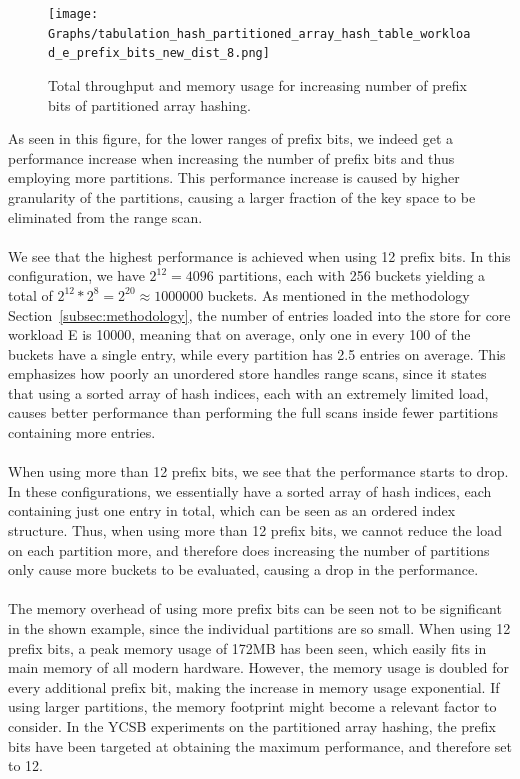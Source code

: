 \documentclass[11pt]{report} %
\begin{document}
\begin{figure}[H]
  \centering
  \texttt{[image: Graphs/tabulation\_hash\_partitioned\_array\_hash\_table\_workload\_e\_prefix\_bits\_new\_dist\_8.png]}\\
  \caption{Total throughput and memory usage for increasing number of prefix bits of partitioned array hashing.}\label{fig:prefix_bits}
\end{figure}
\noindent
As seen in this figure, for the lower ranges of prefix bits, we indeed get a performance increase when increasing the number of prefix bits and thus employing more partitions. This performance increase is caused by higher granularity of the partitions, causing a larger fraction of the key space to be eliminated from the range scan. \\
\\
We see that the highest performance is achieved when using 12 prefix bits. In this configuration, we have $2^{12} = 4096$ partitions, each with 256 buckets yielding a total of $2^{12}*2^8 = 2^{20} \approx 1000000$ buckets. As mentioned in the methodology Section~\ref{subsec:methodology}, the number of entries loaded into the store for core workload E is 10000, meaning that on average, only one in every 100 of the buckets have a single entry, while every partition has 2.5 entries on average. This emphasizes how poorly an unordered store handles range scans, since it states that using a sorted array of hash indices, each with an extremely limited load, causes better performance than performing the full scans inside fewer partitions containing more entries. \\
\\
When using more than 12 prefix bits, we see that the performance starts to drop. In these configurations, we essentially have a sorted array of hash indices, each containing just one entry in total, which can be seen as an ordered index structure. Thus, when using more than 12 prefix bits, we cannot reduce the load on each partition more, and therefore does increasing the number of partitions only cause more buckets to be evaluated, causing a drop in the performance.\\
\\
The memory overhead of using more prefix bits can be seen not to be significant in the shown example, since the individual partitions are so small. When using 12 prefix bits, a peak memory usage of 172MB has been seen, which easily fits in main memory of all modern hardware. However, the memory usage is doubled for every additional prefix bit, making the increase in memory usage exponential. If using larger partitions, the memory footprint might become a relevant factor to consider. In the YCSB experiments on the partitioned array hashing, the prefix bits have been targeted at obtaining the maximum performance, and therefore set to 12.
\end{document}
